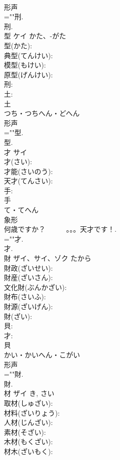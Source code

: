 \documentclass[8pt]{extreport}
\begin{document}
\begin{CJK}{UTF8}{min}
\\	形声 
\\	=""刑.
\\	刑.
\\	型	ケイ	かた、-がた		
\\	型(かた): 
\\	典型(てんけい): 
\\	模型(もけい): 
\\	原型(げんけい): 
\\	刑: 
\\	土: 
\\	土	
\\	つち・つちへん・どへん	
\\	形声 
\\	=""型.
\\	型.
\\	才	サイ			
\\	才(さい): 
\\	才能(さいのう): 
\\	天才(てんさい): 
\\	手: 
\\	手	
\\	て・てへん	
\\	象形 
\\	何歳ですか？　　　。。。天才です！.	
\\	=""才.
\\	才.
\\	財	ザイ、サイ、ゾク	たから		
\\	財政(ざいせい): 
\\	財産(ざいさん): 
\\	文化財(ぶんかざい): 
\\	財布(さいふ): 
\\	財源(ざいげん): 
\\	財(ざい): 
\\	貝: 
\\	才: 
\\	貝	
\\	かい・かいへん・こがい	
\\	形声 
\\	=""財.
\\	財.
\\	材	ザイ		き, さい	
\\	取材(しゅざい): 
\\	材料(ざいりょう): 
\\	人材(じんざい): 
\\	素材(そざい): 
\\	木材(もくざい): 
\\	材木(ざいもく): 

\end{CJK}
\end{document}

